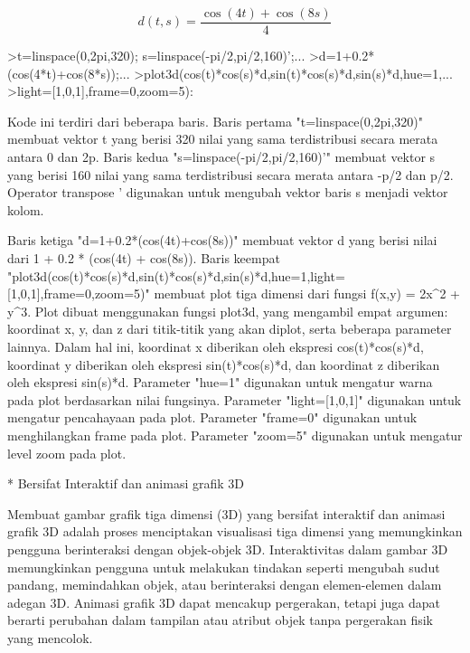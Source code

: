 \documentclass{article}
\begin{document}
\begin{eulernotebook}
\begin{eulercomment}
\begin{eulercomment}
\begin{eulercomment}
\begin{eulercomment}
\begin{eulercomment}
\end{eulercomment}
\begin{eulerformula}
\[
d(t,s) = \frac{\cos(4t)+\cos(8s)}{4}
\]
\end{eulerformula}
\begin{eulerprompt}
>t=linspace(0,2pi,320); s=linspace(-pi/2,pi/2,160)';...
>d=1+0.2*(cos(4*t)+cos(8*s));...
>plot3d(cos(t)*cos(s)*d,sin(t)*cos(s)*d,sin(s)*d,hue=1,...
>light=[1,0,1],frame=0,zoom=5):
\end{eulerprompt}
\begin{eulercomment}
Kode ini terdiri dari beberapa baris. Baris pertama
"t=linspace(0,2pi,320)" membuat vektor t yang berisi 320 nilai yang
sama terdistribusi secara merata antara 0 dan 2p. Baris kedua
"s=linspace(-pi/2,pi/2,160)'" membuat vektor s yang berisi 160 nilai
yang sama terdistribusi secara merata antara -p/2 dan p/2. Operator
transpose ' digunakan untuk mengubah vektor baris s menjadi vektor
kolom.

Baris ketiga "d=1+0.2*(cos(4t)+cos(8s))" membuat vektor d yang berisi
nilai dari 1 + 0.2 * (cos(4t) + cos(8s)). Baris keempat
"plot3d(cos(t)*cos(s)*d,sin(t)*cos(s)*d,sin(s)*d,hue=1,light=[1,0,1],frame=0,zoom=5)"
membuat plot tiga dimensi dari fungsi f(x,y) = 2x\textasciicircum{}2 + y\textasciicircum{}3. Plot dibuat
menggunakan fungsi plot3d, yang mengambil empat argumen: koordinat x,
y, dan z dari titik-titik yang akan diplot, serta beberapa parameter
lainnya. Dalam hal ini, koordinat x diberikan oleh ekspresi
cos(t)*cos(s)*d, koordinat y diberikan oleh ekspresi sin(t)*cos(s)*d,
dan koordinat z diberikan oleh ekspresi sin(s)*d. Parameter "hue=1"
digunakan untuk mengatur warna pada plot berdasarkan nilai fungsinya.
Parameter "light=[1,0,1]" digunakan untuk mengatur pencahayaan pada
plot. Parameter "frame=0" digunakan untuk menghilangkan frame pada
plot. Parameter "zoom=5" digunakan untuk mengatur level zoom pada
plot.
\end{eulercomment}
\begin{eulercomment}
* Bersifat Interaktif dan animasi grafik 3D
\end{eulercomment}
\begin{eulercomment}
Membuat gambar grafik tiga dimensi (3D) yang bersifat interaktif dan
animasi grafik 3D adalah proses menciptakan visualisasi tiga dimensi
yang memungkinkan pengguna berinteraksi dengan objek-objek 3D.
Interaktivitas dalam gambar 3D memungkinkan pengguna untuk melakukan
tindakan seperti mengubah sudut pandang, memindahkan objek, atau
berinteraksi dengan elemen-elemen dalam adegan 3D. Animasi grafik 3D
dapat mencakup pergerakan, tetapi juga dapat berarti perubahan dalam
tampilan atau atribut objek tanpa pergerakan fisik yang mencolok.


\end{eulercomment}
\end{eulercomment}
\end{eulercomment}
\end{eulercomment}
\end{eulercomment}
\end{eulernotebook}
\end{document}

